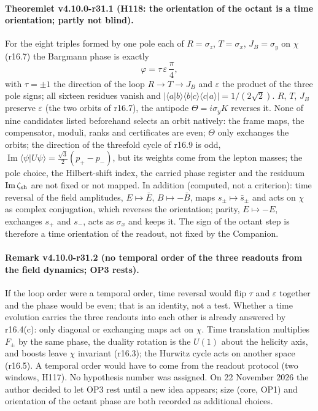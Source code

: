 \paragraph{Theoremlet v4.10.0-r31.1 (H118: the orientation of the octant is a time orientation; partly not blind).}
For the eight triples formed by one pole each of \(R=\sigma_z\), \(T=\sigma_x\), \(J_B=\sigma_y\) on \(\chi\) (r16.7) the Bargmann phase is exactly
\[
\varphi=\tau\,\varepsilon\,\frac{\pi}{4},
\]
with \(\tau=\pm1\) the direction of the loop \(R\to T\to J_B\) and \(\varepsilon\) the product of the three pole signs; all sixteen residues
vanish and \(|\langle a|b\rangle\langle b|c\rangle\langle c|a\rangle|=1/(2\sqrt2)\).  \(R\), \(T\), \(J_B\) preserve \(\varepsilon\) (the two orbits of r16.7), the
antipode \(\Theta=i\sigma_yK\) reverses it.  None of nine candidates listed beforehand selects an orbit natively: the frame maps, the
compensator, moduli, ranks and certificates are even; \(\Theta\) only exchanges the orbits; the direction of the threefold cycle of r16.9
is odd, \(\operatorname{Im}\langle\psi|U\psi\rangle=\tfrac{\sqrt3}{2}(p_+-p_-)\), but its weights come from the lepton masses; the pole choice,
the Hilbert-shift index, the carried phase register and the residuum \(\operatorname{Im}\zeta_{\rm sh}\) are not fixed or not mapped.  In
addition (computed, not a criterion): time reversal of the field amplitudes, \(E\mapsto\bar E\), \(B\mapsto-\bar B\), maps \(s_\pm\mapsto\bar s_\pm\)
and acts on \(\chi\) as complex conjugation, which reverses the orientation; parity, \(E\mapsto-E\), exchanges \(s_+\) and \(s_-\), acts as
\(\sigma_x\) and keeps it.  The sign of the octant step is therefore a time orientation of the readout, not fixed by the Companion.

\paragraph{Remark v4.10.0-r31.2 (no temporal order of the three readouts from the field dynamics; OP3 rests).}
If the loop order were a temporal order, time reversal would flip \(\tau\) and \(\varepsilon\) together and the phase would be even; that is
an identity, not a test.  Whether a time evolution carries the three readouts into each other is already answered by r16.4(c): only
diagonal or exchanging maps act on \(\chi\).  Time translation multiplies \(F_\pm\) by the same phase, the duality rotation is the \(U(1)\) about
the helicity axis, and boosts leave \(\chi\) invariant (r16.3); the Hurwitz cycle acts on another space (r16.5).  A temporal order would
have to come from the readout protocol (two windows, H117).  No hypothesis number was assigned.  On 22 November 2026 the author decided
to let OP3 rest until a new idea appears; size (core, OP1) and orientation of the octant phase are both recorded as additional choices.

